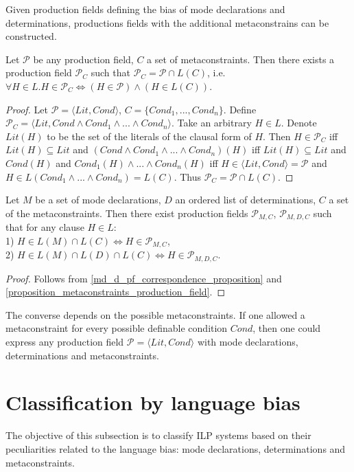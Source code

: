 Given production fields defining the bias of mode declarations and determinations, productions fields with the additional metaconstrains can be constructed.

\begin{proposition}\label{proposition_metaconstraints_production_field}
Let $\mathcal{P}$ be any production field, $C$ a set of metaconstraints.
Then there exists a production field $\mathcal{P}_C$ such that
$\mathcal{P}_C=\mathcal{P} \cap L(C)$, i.e.
$\forall H \in L. H \in \mathcal{P}_C \iff (H \in \mathcal{P}) \land (H \in L(C))$.
\end{proposition}
\begin{proof}
Let $\mathcal{P}=\langle Lit, Cond \rangle$,
$C=\{Cond_1, ..., Cond_n\}$.
Define $\mathcal{P}_C=\langle Lit, Cond \land Cond_1 \land ... \land Cond_n \rangle$. Take an arbitrary $H \in L$. Denote $Lit(H)$ to be the set of the literals of the clausal form of $H$.
Then $H \in \mathcal{P}_C$ iff $Lit(H) \subseteq Lit$ and
$(Cond \land Cond_1 \land ... \land Cond_n)(H)$ iff
$Lit(H) \subseteq Lit$ and $Cond(H)$ and $Cond_1(H) \land ... \land Cond_n(H)$
iff $H \in \langle Lit, Cond \rangle = \mathcal{P}$ and $H \in L(Cond_1 \land ... \land Cond_n) = L(C)$. Thus $\mathcal{P}_C=\mathcal{P} \cap L(C)$.
\end{proof}

\begin{corollary}
Let $M$ be a set of mode declarations, $D$ an ordered list of determinations, $C$ a set of the metaconstraints.
Then there exist production fields
$\mathcal{P}_{M,C}$,
$\mathcal{P}_{M,D,C}$
such that for any clause $H \in L$:\\
1) $H \in L(M) \cap L(C) \iff H \in \mathcal{P}_{M,C}$,\\
2) $H \in L(M) \cap L(D) \cap L(C) \iff H \in \mathcal{P}_{M,D,C}$.\\
\end{corollary}
\begin{proof}
Follows from \ref{md_d_pf_correspondence_proposition} and \ref{proposition_metaconstraints_production_field}.
\end{proof}

The converse depends on the possible metaconstraints. If one allowed a metaconstraint for every possible definable condition $Cond$, then one could express any production field $\mathcal{P}=\langle Lit, Cond \rangle$ with mode declarations, determinations and metaconstraints.

\section{Classification by language bias}\label{sec:classification_language_bias}
The objective of this subsection is to classify ILP systems based on their peculiarities related to the language bias: mode declarations, determinations and metaconstraints.


